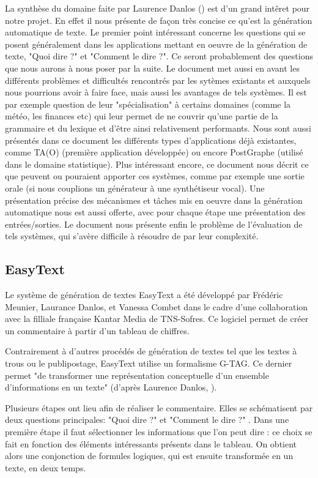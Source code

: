 \documentclass[12pt]{report}
\begin{document}
La synthèse du domaine faite par Laurence Danlos (\cite{Dan00}) est d'un grand intêret pour notre projet. En effet il nous présente de façon très concise ce qu'est la génération automatique de texte. Le premier point intéressant concerne les questions qui se posent généralement dans les applications mettant en oeuvre de la génération de texte, "Quoi dire ?" et "Comment le dire ?". Ce seront probablement des questions que nous aurons à nous poser par la suite. Le document met aussi en avant les différents problèmes et difficultés rencontrés par les sytèmes existants et auxquels nous pourrions avoir à faire face, mais aussi les avantages de tels systèmes. Il est par exemple question de leur "spécialisation" à certains domaines (comme la météo, les finances etc) qui leur permet de ne couvrir qu'une partie de la grammaire et du lexique et d'être ainsi relativement performants. Nous sont aussi présentés dans ce document les différents types d'applications déjà existantes, comme TA(O) (première application développée) ou encore PostGraphe (utilisé dans le domaine statistique). Plus intéressant encore, ce document nous décrit ce que peuvent ou pouraient apporter ces systèmes, comme par exemple une sortie orale (si nous couplions un générateur à une synthétiseur vocal). Une présentation précise des mécanismes et tâches mis en oeuvre dans la génération automatique nous est aussi offerte, avec pour chaque étape une présentation des entrées/sorties. Le document nous présente enfin le problème de l'évaluation de tels systèmes, qui s'avère difficile à résoudre de par leur complexité.

\subsection{EasyText}
Le système de génération de textes EasyText \cite{Dan11} a été développé par Frédéric Meunier, Laurance Danlos, et Vanessa Combet dans le cadre d'une collaboration avec la filliale française Kantar Media de TNS-Sofres. Ce logiciel permet de créer un commentaire à partir d'un tableau de chiffres. 

Contrairement à d'autres procédés de génération de textes tel que les textes à trous ou le publipostage, EasyText utilise un formalisme G-TAG. Ce dernier permet "de transformer une représentation conceptuelle d'un ensemble d'informations en un texte" (d'après Laurence Danlos, \cite {Dan10}). 

\bigskip

Plusieurs étapes ont lieu afin de réaliser le commentaire. Elles se schématisent par deux questions principales: "Quoi dire ?" et "Comment le dire ?" . Dans une première étape il faut sélectionner les informations que l'on peut dire : ce choix se fait en fonction des éléments intéressants présents dans le tableau. On obtient alors une conjonction de formules logiques, qui est ensuite transformée en un texte, en deux temps.
\end{document}
